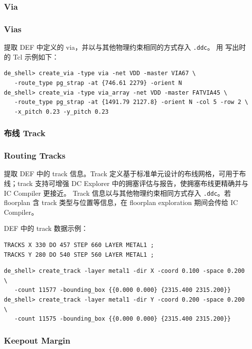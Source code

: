 \subsubsection{Via}
\subsubsection*{Vias}

 提取 DEF 中定义的 via，并以与其他物理约束相同的方式存入 \texttt{.ddc}。
用  写出时的 Tcl 示例如下：

\begin{lstlisting}
de_shell> create_via -type via -net VDD -master VIA67 \
   -route_type pg_strap -at {746.61 2279} -orient N
de_shell> create_via -type via_array -net VDD -master FATVIA45 \
   -route_type pg_strap -at {1491.79 2127.8} -orient N -col 5 -row 2 \
   -x_pitch 0.23 -y_pitch 0.23
\end{lstlisting}

\subsubsection{布线 Track}
\subsubsection*{Routing Tracks}

 提取 DEF 中的 track 信息。Track 定义基于标准单元设计的布线网格，可用于布线；track 支持可增强 DC Explorer 中的拥塞评估与报告，使拥塞布线更精确并与 IC Compiler 更接近。
Track 信息以与其他物理约束相同方式存入 \texttt{.ddc}。若 floorplan 含 track 类型与位置等信息，在 floorplan exploration 期间会传给 IC Compiler。

DEF 中的 track 数据示例：
\begin{lstlisting}
TRACKS X 330 DO 457 STEP 660 LAYER METAL1 ;
TRACKS Y 280 DO 540 STEP 560 LAYER METAL1 ;
\end{lstlisting}

\begin{lstlisting}
de_shell> create_track -layer metal1 -dir X -coord 0.100 -space 0.200 \
   -count 11577 -bounding_box {{0.000 0.000} {2315.400 2315.200}}
de_shell> create_track -layer metal1 -dir Y -coord 0.200 -space 0.200 \
   -count 11575 -bounding_box {{0.000 0.000} {2315.400 2315.200}}
\end{lstlisting}

\subsubsection{Keepout Margin}
